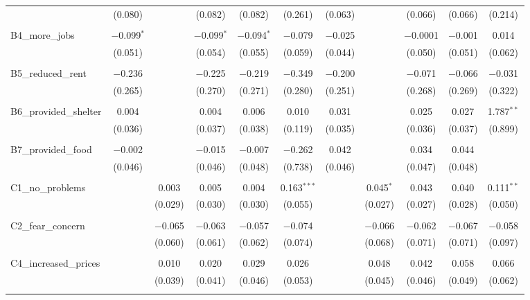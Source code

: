 \begin{table}[H]
\begin{tabular}{@{\extracolsep{4pt}}lcccccccccc}
  & (0.080) &  & (0.082) & (0.082) & (0.261) & (0.063) &  & (0.066) & (0.066) & (0.214) \\ 
  & & & & & & & & & & \\ 
 B4\_more\_jobs & $-$0.099$^{*}$ &  & $-$0.099$^{*}$ & $-$0.094$^{*}$ & $-$0.079 & $-$0.025 &  & $-$0.0001 & $-$0.001 & 0.014 \\ 
  & (0.051) &  & (0.054) & (0.055) & (0.059) & (0.044) &  & (0.050) & (0.051) & (0.062) \\ 
  & & & & & & & & & & \\ 
 B5\_reduced\_rent & $-$0.236 &  & $-$0.225 & $-$0.219 & $-$0.349 & $-$0.200 &  & $-$0.071 & $-$0.066 & $-$0.031 \\ 
  & (0.265) &  & (0.270) & (0.271) & (0.280) & (0.251) &  & (0.268) & (0.269) & (0.322) \\ 
  & & & & & & & & & & \\ 
 B6\_provided\_shelter & 0.004 &  & 0.004 & 0.006 & 0.010 & 0.031 &  & 0.025 & 0.027 & 1.787$^{**}$ \\ 
  & (0.036) &  & (0.037) & (0.038) & (0.119) & (0.035) &  & (0.036) & (0.037) & (0.899) \\ 
  & & & & & & & & & & \\ 
 B7\_provided\_food & $-$0.002 &  & $-$0.015 & $-$0.007 & $-$0.262 & 0.042 &  & 0.034 & 0.044 &  \\ 
  & (0.046) &  & (0.046) & (0.048) & (0.738) & (0.046) &  & (0.047) & (0.048) &  \\ 
  & & & & & & & & & & \\ 
 C1\_no\_problems &  & 0.003 & 0.005 & 0.004 & 0.163$^{***}$ &  & 0.045$^{*}$ & 0.043 & 0.040 & 0.111$^{**}$ \\ 
  &  & (0.029) & (0.030) & (0.030) & (0.055) &  & (0.027) & (0.027) & (0.028) & (0.050) \\ 
  & & & & & & & & & & \\ 
 C2\_fear\_concern &  & $-$0.065 & $-$0.063 & $-$0.057 & $-$0.074 &  & $-$0.066 & $-$0.062 & $-$0.067 & $-$0.058 \\ 
  &  & (0.060) & (0.061) & (0.062) & (0.074) &  & (0.068) & (0.071) & (0.071) & (0.097) \\ 
  & & & & & & & & & & \\ 
 C4\_increased\_prices &  & 0.010 & 0.020 & 0.029 & 0.026 &  & 0.048 & 0.042 & 0.058 & 0.066 \\ 
  &  & (0.039) & (0.041) & (0.046) & (0.053) &  & (0.045) & (0.046) & (0.049) & (0.062) \\ 
  & & & & & & & & & & \\ 

\end{tabular}
\end{table}
